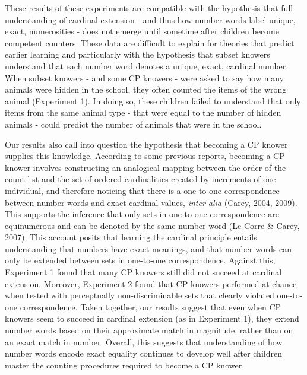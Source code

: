 \documentclass[
  man,floatsintext]{apa7}
\begin{document}
These results of these experiments are compatible with the hypothesis that full understanding of cardinal extension - and thus how number words label unique, exact, numerosities - does not emerge until sometime after children become competent counters. These data are difficult to explain for theories that predict earlier learning and particularly with the hypothesis that subset knowers understand that each number word denotes a unique, exact, cardinal number. When subset knowers - and some CP knowers - were asked to say how many animals were hidden in the school, they often counted the items of the wrong animal (Experiment 1). In doing so, these children failed to understand that only items from the same animal type - that were equal to the number of hidden animals - could predict the number of animals that were in the school.

Our results also call into question the hypothesis that becoming a CP knower supplies this knowledge. According to some previous reports, becoming a CP knower involves constructing an analogical mapping between the order of the count list and the set of ordered cardinalities created by increments of one individual, and therefore noticing that there is a one-to-one correspondence between number words and exact cardinal values, \emph{inter alia} (Carey, 2004, 2009). This supports the inference that only sets in one-to-one correspondence are equinumerous and can be denoted by the same number word (Le Corre \& Carey, 2007). This account posits that learning the cardinal principle entails understanding that numbers have exact meanings, and that number words can only be extended between sets in one-to-one correspondence. Against this, Experiment 1 found that many CP knowers still did not succeed at cardinal extension. Moreover, Experiment 2 found that CP knowers performed at chance when tested with perceptually non-discriminable sets that clearly violated one-to-one correspondence. Taken together, our results suggest that even when CP knowers seem to succeed in cardinal extension (as in Experiment 1), they extend number words based on their approximate match in magnitude, rather than on an exact match in number. Overall, this suggests that understanding of how number words encode exact equality continues to develop well after children master the counting procedures required to become a CP knower.
\end{document}
